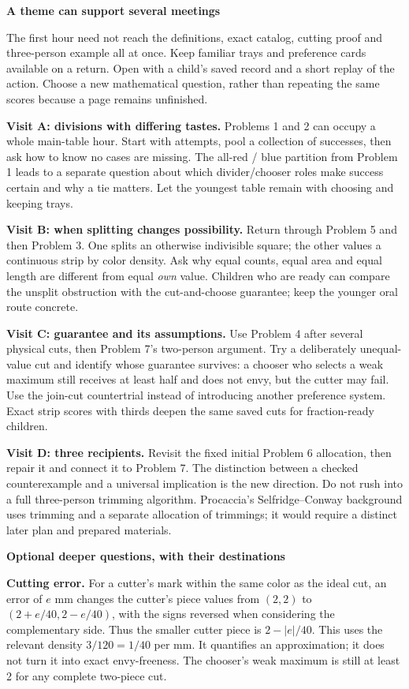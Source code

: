 \documentclass[11pt]{article}
\newcommand{\heading}[1]{\par\vspace{1.5mm}{\large\bfseries #1}\par\vspace{.8mm}}
\newcommand{\subhead}[1]{\par\vspace{1mm}\textbf{#1}\par}
\newcommand{\page}[1]{\newpage\heading{#1}}
\begin{document}
\page{Return visits, extensions and what to record}
\subhead{A theme can support several meetings}
The first hour need not reach the definitions, exact catalog, cutting proof and three-person example all at once. Keep familiar trays and preference cards available on a return. Open with a child's saved record and a short replay of the action. Choose a new mathematical question, rather than repeating the same scores because a page remains unfinished.

\textbf{Visit A: divisions with differing tastes.} Problems 1 and 2 can occupy a whole main-table hour. Start with attempts, pool a collection of successes, then ask how to know no cases are missing. The all-red / blue partition from Problem 1 leads to a separate question about which divider/chooser roles make success certain and why a tie matters. Let the youngest table remain with choosing and keeping trays.

\textbf{Visit B: when splitting changes possibility.} Return through Problem 5 and then Problem 3. One splits an otherwise indivisible square; the other values a continuous strip by color density. Ask why equal counts, equal area and equal length are different from equal \emph{own} value. Children who are ready can compare the unsplit obstruction with the cut-and-choose guarantee; keep the younger oral route concrete.

\textbf{Visit C: guarantee and its assumptions.} Use Problem 4 after several physical cuts, then Problem 7's two-person argument. Try a deliberately unequal-value cut and identify whose guarantee survives: a chooser who selects a weak maximum still receives at least half and does not envy, but the cutter may fail. Use the join-cut countertrial instead of introducing another preference system. Exact strip scores with thirds deepen the same saved cuts for fraction-ready children.

\textbf{Visit D: three recipients.} Revisit the fixed initial Problem 6 allocation, then repair it and connect it to Problem 7. The distinction between a checked counterexample and a universal implication is the new direction. Do not rush into a full three-person trimming algorithm. Procaccia's Selfridge--Conway background uses trimming and a separate allocation of trimmings; it would require a distinct later plan and prepared materials.

\subhead{Optional deeper questions, with their destinations}
\textbf{Cutting error.} For a cutter's mark within the same color as the ideal cut, an error of $e$ mm changes the cutter's piece values from $(2,2)$ to $(2+e/40,2-e/40)$, with the signs reversed when considering the complementary side. Thus the smaller cutter piece is $2-|e|/40$. This uses the relevant density $3/120=1/40$ per mm. It quantifies an approximation; it does not turn it into exact envy-freeness. The chooser's weak maximum is still at least 2 for any complete two-piece cut.
\end{document}
